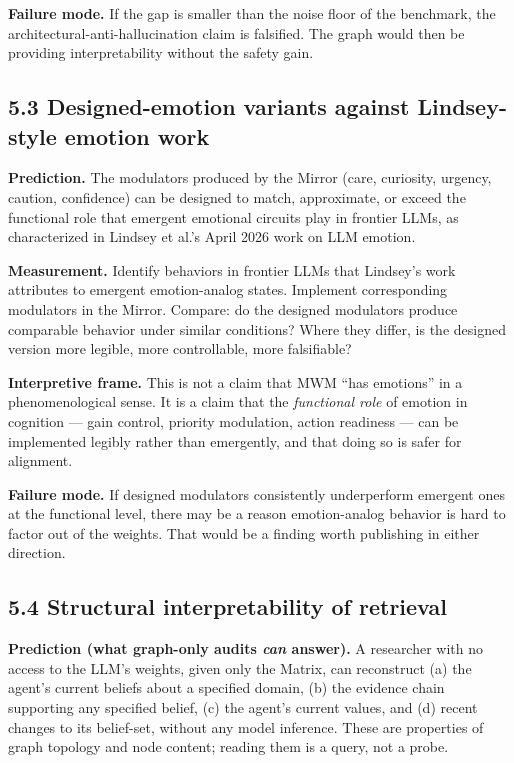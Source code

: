 \documentclass[12pt]{article}
\begin{document}
\textbf{Failure mode.} If the gap is smaller than the noise floor of the benchmark, the architectural-anti-hallucination claim is falsified. The graph would then be providing interpretability without the safety gain.

\subsection{5.3 Designed-emotion variants against Lindsey-style emotion work}\label{designed-emotion-variants-against-lindsey-style-emotion-work}

\textbf{Prediction.} The modulators produced by the Mirror (care, curiosity, urgency, caution, confidence) can be designed to match, approximate, or exceed the functional role that emergent emotional circuits play in frontier LLMs, as characterized in Lindsey et al.'s April 2026 work on LLM emotion.

\textbf{Measurement.} Identify behaviors in frontier LLMs that Lindsey's work attributes to emergent emotion-analog states. Implement corresponding modulators in the Mirror. Compare: do the designed modulators produce comparable behavior under similar conditions? Where they differ, is the designed version more legible, more controllable, more falsifiable?

\textbf{Interpretive frame.} This is not a claim that MWM ``has emotions'' in a phenomenological sense. It is a claim that the \emph{functional role} of emotion in cognition --- gain control, priority modulation, action readiness --- can be implemented legibly rather than emergently, and that doing so is safer for alignment.

\textbf{Failure mode.} If designed modulators consistently underperform emergent ones at the functional level, there may be a reason emotion-analog behavior is hard to factor out of the weights. That would be a finding worth publishing in either direction.

\subsection{5.4 Structural interpretability of retrieval}\label{structural-interpretability-of-retrieval}

\textbf{Prediction (what graph-only audits \emph{can} answer).} A researcher with no access to the LLM's weights, given only the Matrix, can reconstruct (a) the agent's current beliefs about a specified domain, (b) the evidence chain supporting any specified belief, (c) the agent's current values, and (d) recent changes to its belief-set, without any model inference. These are properties of graph topology and node content; reading them is a query, not a probe.
\end{document}
